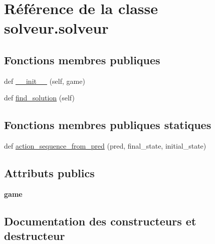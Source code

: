 \hypertarget{classsolveur_1_1solveur}{}\section{Référence de la classe solveur.\+solveur}
\label{classsolveur_1_1solveur}
\subsection*{Fonctions membres publiques}
\begin{DoxyCompactItemize}
\item 
def \hyperlink{classsolveur_1_1solveur_aaac83179919b07e763025ea73d4ccce3}{\+\_\+\+\_\+init\+\_\+\+\_\+} (self, game)
\item 
def \hyperlink{classsolveur_1_1solveur_aae96bc7e6e7b11a51d4a55564414ba92}{find\+\_\+solution} (self)
\end{DoxyCompactItemize}
\subsection*{Fonctions membres publiques statiques}
\begin{DoxyCompactItemize}
\item 
def \hyperlink{classsolveur_1_1solveur_af3ccbdb13bf858ee950da16f2d736d52}{action\+\_\+sequence\+\_\+from\+\_\+pred} (pred, final\+\_\+state, initial\+\_\+state)
\end{DoxyCompactItemize}
\subsection*{Attributs publics}
\begin{DoxyCompactItemize}
\item 
\mbox{\label{classsolveur_1_1solveur_ad73a71390ca87152dc67d4f0855675ee}} 
{\bfseries game}
\end{DoxyCompactItemize}


\subsection{Documentation des constructeurs et destructeur}
\mbox{\label{classsolveur_1_1solveur_aaac83179919b07e763025ea73d4ccce3}} 
